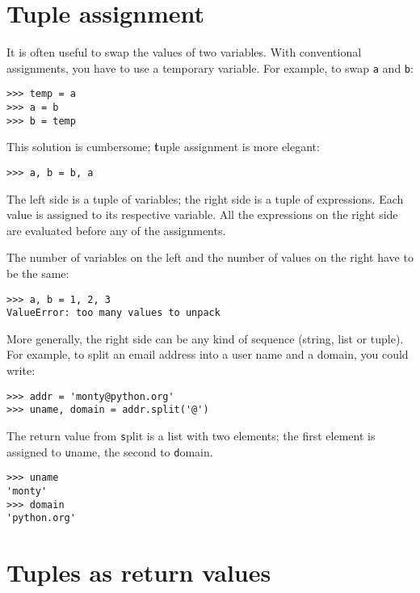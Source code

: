 \documentclass[
DIV=11,
fontsize=12,
twoside,
headinclude=false,
titlepage=firstiscover,
abstract=true,
headsepline=true,
footsepline=true,
chapterprefix=true, %
headings=big,
bibliography=totoc,%
captions=tableheading
]{scrbook}
\theoremstyle{definition}
\begin{document}
\section{Tuple assignment}
\label{tuple.assignment}

It is often useful to swap the values of two variables.
With conventional assignments, you have to use a temporary
variable.  For example, to swap {\texttt a} and {\texttt b}:

\begin{lstlisting}
>>> temp = a
>>> a = b
>>> b = temp
\end{lstlisting}
%
This solution is cumbersome; {\textbf tuple assignment} is more elegant:

\begin{lstlisting}
>>> a, b = b, a
\end{lstlisting}
%
The left side is a tuple of variables; the right side is a tuple of
expressions.  Each value is assigned to its respective variable.  
All the expressions on the right side are evaluated before any
of the assignments.

The number of variables on the left and the number of
values on the right have to be the same:

\begin{lstlisting}
>>> a, b = 1, 2, 3
ValueError: too many values to unpack
\end{lstlisting}
%
More generally, the right side can be any kind of sequence
(string, list or tuple).  For example, to split an email address
into a user name and a domain, you could write:

\begin{lstlisting}
>>> addr = 'monty@python.org'
>>> uname, domain = addr.split('@')
\end{lstlisting}
%
The return value from {\texttt split} is a list with two elements;
the first element is assigned to {\texttt uname}, the second to
{\texttt domain}.

\begin{lstlisting}
>>> uname
'monty'
>>> domain
'python.org'
\end{lstlisting}
%

\section{Tuples as return values}
\end{document}
